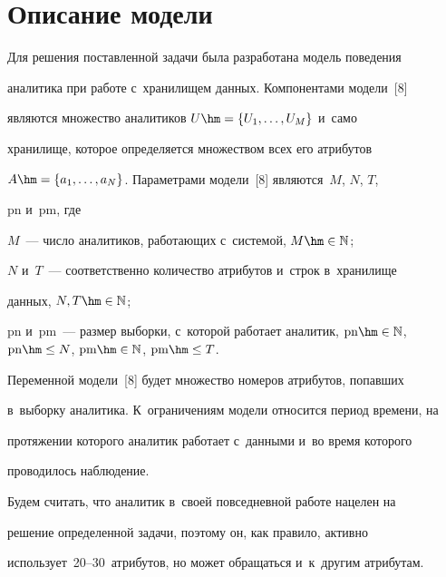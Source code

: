     \section{Описание модели}


    


   \vspace*{-3pt}


    


  Для решения поставленной задачи была разработана модель поведения 


аналитика при работе с~хранилищем данных. Компонентами модели~[8] 


являются множество аналитиков $U\hm= \{U_1,\ldots, U_M\}$ и~само 


хранилище, которое определяется множеством всех его атрибутов 


$A\hm=\{a_1, \ldots, a_N\}$. Параметрами модели~[8] являются~$M$, $N$, $T$, 


$\mathrm{pn}$ и~$\mathrm{pm}$, где


  $M$~--- число аналитиков, работающих с~системой, $M\hm\in \mathbb{N}$; 


  $N$ и~$T$~--- соответственно количество атрибутов и~строк в~хранилище 


данных, $N, T\hm\in \mathbb{N}$; 


$\mathrm{pn}$ и~$\mathrm{pm}$~--- размер выборки, с~которой работает аналитик, $\mathrm{pn}\hm\in 


\mathbb{N}$, $\mathrm{pn}\hm\leq N$, $\mathrm{pm}\hm\in \mathbb{N}$, $\mathrm{pm}\hm\leq T$.


  


Переменной модели~[8] будет множество номеров атрибутов, попавших 


в~выборку аналитика. К~ограничениям модели относится период времени, на 


протяжении которого аналитик работает с~данными и~во время которого 


проводилось наблюдение.


  


  Будем считать, что аналитик в~своей повседневной работе нацелен на 


решение определенной задачи, поэтому он, как правило, активно 


использует~20--30~атрибутов, но может обращаться и~к~другим атрибутам. 



